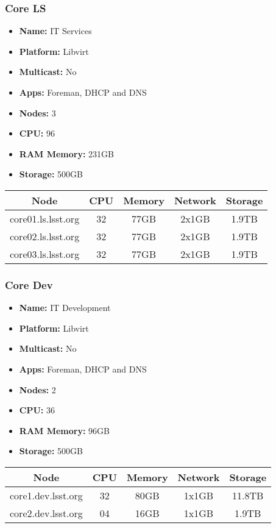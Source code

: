\subsubsection{Core LS}
\begin{itemize}
  \itemsep0em 
  \item \textbf{Name:}      IT Services
  \item \textbf{Platform:}        Libvirt
  \item \textbf{Multicast:}  No
  \item \textbf{Apps:}       Foreman, DHCP and DNS
  \item \textbf{Nodes:}      3
  \item \textbf{CPU:}        96
  \item \textbf{RAM Memory:} 231GB
  \item \textbf{Storage:}   500GB
\end{itemize}
\begin{center}
  \small
  \begin{tabular}{||c c c c c||} 
    \hline
    \textbf{Node} & \textbf{CPU} & \textbf{Memory} & \textbf{Network} & \textbf{Storage} \\ [0.5ex]
    \hline
    core01.ls.lsst.org & 32 & 77GB & 2x1GB & 1.9TB \\
    \hline
    core02.ls.lsst.org & 32 & 77GB & 2x1GB & 1.9TB \\
    \hline
    core03.ls.lsst.org & 32 & 77GB & 2x1GB & 1.9TB \\
    \hline
  \end{tabular}
\end{center}

\subsubsection{Core Dev}
\begin{itemize}
  \itemsep0em 
  \item \textbf{Name:}       IT Development
  \item \textbf{Platform:}   Libvirt
  \item \textbf{Multicast:}  No
  \item \textbf{Apps:}       Foreman, DHCP and DNS
  \item \textbf{Nodes:}      2
  \item \textbf{CPU:}        36
  \item \textbf{RAM Memory:} 96GB
  \item \textbf{Storage:}   500GB
\end{itemize}
\begin{center}
  \small
  \begin{tabular}{||c c c c c||}
    \hline
    \textbf{Node} & \textbf{CPU} & \textbf{Memory} & \textbf{Network} & \textbf{Storage} \\ [0.5ex]
    \hline
    core1.dev.lsst.org & 32 & 80GB & 1x1GB & 11.8TB \\
    \hline
    core2.dev.lsst.org & 04 & 16GB & 1x1GB & 1.9TB \\
    \hline
  \end{tabular}
\end{center}

